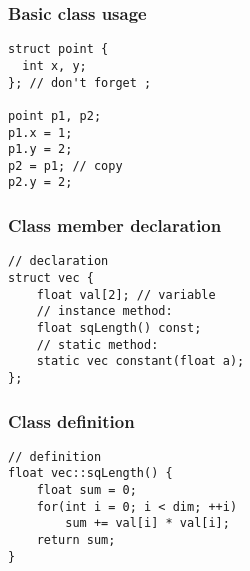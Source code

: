 
\begin{frame}
\end{frame}

%

\begin{frame}[fragile]
\frametitle{Basic class usage}
\begin{lstlisting}
struct point {
  int x, y;
}; // don't forget ;

point p1, p2;
p1.x = 1;
p1.y = 2;
p2 = p1; // copy
p2.y = 2;
\end{lstlisting}
\end{frame}

\begin{frame}[fragile]
\frametitle{Class member declaration}
\begin{lstlisting}
// declaration
struct vec {
    float val[2]; // variable
    // instance method:
    float sqLength() const;
    // static method:
    static vec constant(float a);
};
\end{lstlisting}
\end{frame}

\begin{frame}[fragile]
\frametitle{Class definition}
\begin{lstlisting}
// definition
float vec::sqLength() {
    float sum = 0;
    for(int i = 0; i < dim; ++i)
        sum += val[i] * val[i];
    return sum;
}
\end{lstlisting}
\end{frame}

